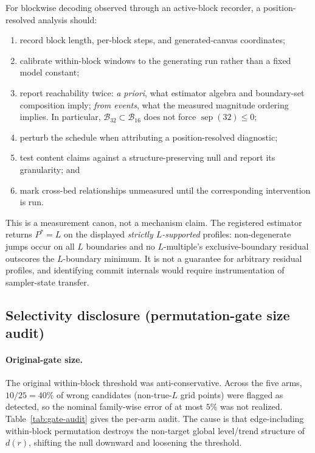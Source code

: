 \documentclass{article}
\begin{document}
For blockwise decoding observed through an active-block recorder, a
position-resolved analysis should:
\begin{enumerate}
  \item record block length, per-block steps, and generated-canvas coordinates;
  \item calibrate within-block windows to the generating run rather than a fixed
  model constant;
  \item report reachability twice: \emph{a priori}, what estimator algebra and
  boundary-set composition imply; \emph{from events}, what the measured magnitude
  ordering implies. In particular,
  $\mathcal B_{32}\subset\mathcal B_{16}$ does not force
  $\operatorname{sep}(32)\le0$;
  \item perturb the schedule when attributing a position-resolved diagnostic;
  \item test content claims against a structure-preserving null and report its
  granularity; and
  \item mark cross-bed relationships unmeasured until the corresponding
  intervention is run.
\end{enumerate}
This is a measurement canon, not a mechanism claim. The registered estimator
returns $P^*=L$ on the displayed \emph{strictly $L$-supported} profiles:
non-degenerate jumps occur on all $L$ boundaries and no $L$-multiple's
exclusive-boundary residual outscores the $L$-boundary minimum. It is not a
guarantee for arbitrary residual profiles, and identifying commit internals would
require instrumentation of sampler-state transfer.

\subsection{Selectivity disclosure (permutation-gate size audit)}
\label{sec:selectivity-audit}

\paragraph{Original-gate size.}
The original within-block threshold was anti-conservative. Across the five arms,
$10/25=40\%$ of wrong candidates (non-true-$L$ grid points) were flagged as
detected, so the nominal family-wise error of at most $5\%$ was not realized.
Table~\ref{tab:gate-audit} gives the per-arm audit. The cause is that
edge-including within-block permutation destroys the non-target global
level/trend structure of $d(r)$, shifting the null downward and loosening the
threshold.
\end{document}
